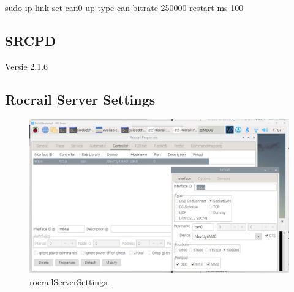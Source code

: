 sudo ip link set can0 up type can bitrate 250000 restart-ms 100

\subsection{SRCPD}
Versie 2.1.6
\subsection{Rocrail Server Settings}



\begin{figure}[h!]
	\centering
	\includegraphics[width=1.00\linewidth]{../figures/rocrailServerSettings.png}
	\caption{rocrailServerSettings.}
	\label{fig:rocrailServerSettings}
\end{figure}


